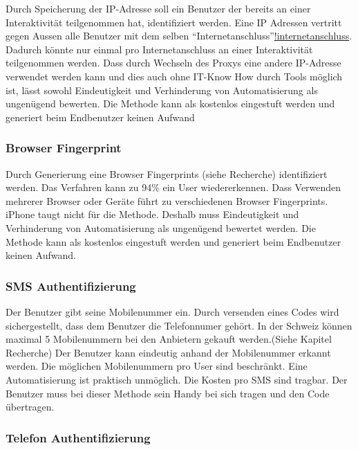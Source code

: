 Durch Speicherung der IP-Adresse soll ein Benutzer der bereits an einer
Interaktivität teilgenommen hat, identifiziert werden. Eine IP Adressen
vertritt gegen Aussen alle Benutzer mit dem selben
``Internetanschluss''\href{Der\%20Begriff\%20Internetanschluss\%20ist\%20schwamig\%20eingesetzt.}{!internetanschluss}.
Dadurch könnte nur einmal pro Internetanschluss an einer Interaktivität
teilgenommen werden. Dass durch Wechseln des Proxys eine andere
IP-Adresse verwendet werden kann und dies auch ohne IT-Know How durch
Tools möglich ist, lässt sowohl Eindeutigkeit und Verhinderung von
Automatisierung als ungenügend bewerten. Die Methode kann als kostenlos
eingestuft werden und generiert beim Endbenutzer keinen Aufwand

\subsubsection{Browser Fingerprint}\label{browser-fingerprint}

Durch Generierung eine Browser Fingerprints (siehe Recherche)
identifiziert werden. Das Verfahren kann zu 94\% ein User
wiedererkennen. Dass Verwenden mehrerer Browser oder Geräte führt zu
verschiedenen Browser Fingerprints. iPhone taugt nicht für die Methode.
Deshalb muss Eindeutigkeit und Verhinderung von Automatisierung als
ungenügend bewertet werden. Die Methode kann als kostenlos eingestuft
werden und generiert beim Endbenutzer keinen Aufwand.

\subsubsection{SMS Authentifizierung}\label{sms-authentifizierung}

Der Benutzer gibt seine Mobilenummer ein. Durch versenden eines Codes
wird sichergestellt, dass dem Benutzer die Telefonnumer gehört. In der
Schweiz können maximal 5 Mobilenummern bei den Anbietern gekauft
werden.(Siehe Kapitel Recherche) Der Benutzer kann eindeutig anhand der
Mobilenummer erkannt werden. Die möglichen Mobilenummern pro User sind
beschränkt. Eine Automatisierung ist praktisch unmöglich. Die Kosten pro
SMS sind tragbar. Der Benutzer muss bei dieser Methode sein Handy bei
sich tragen und den Code übertragen.

\subsubsection{Telefon
Authentifizierung}\label{telefon-authentifizierung}

